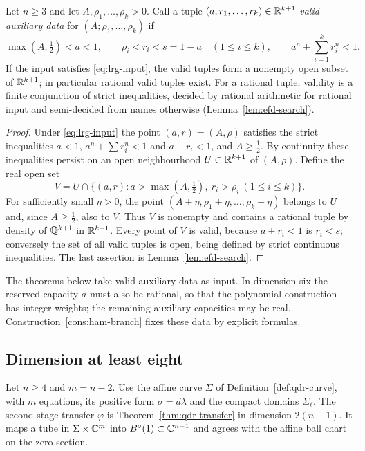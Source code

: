 \begin{lemma}\label{lem:lrg-auxiliary}
Let $n\ge3$ and let $A,\rho_1,\dots,\rho_k>0$. Call a tuple $(a;r_1,\dots,r_k)\in\mathbb{R}^{k+1}$
\emph{valid auxiliary data} for $(A;\rho_1,\dots,\rho_k)$ if
\begin{equation}\label{eq:lrg-certificate}
 \max(A,\tfrac12)<a<1,\qquad \rho_i<r_i<s=1-a\quad(1\le i\le k),\qquad a^n+\sum_{i=1}^kr_i^n<1 .
\end{equation}
If the input satisfies \eqref{eq:lrg-input}, the valid tuples form a nonempty open subset of $\mathbb{R}^{k+1}$; in
particular rational valid tuples exist. For a rational tuple, validity is a finite conjunction of strict inequalities,
decided by rational arithmetic for rational input and semi-decided from names otherwise
(Lemma~\ref{lem:efd-search}).
\end{lemma}

\begin{proof}
Under \eqref{eq:lrg-input} the point $(a,r)=(A,\rho)$ satisfies the strict
inequalities $a<1$, $a^n+\sum r_i^n<1$ and $a+r_i<1$, and $A\ge\frac12$. By continuity these inequalities
persist on an open neighbourhood $U\subset\mathbb{R}^{k+1}$ of $(A,\rho)$. Define the real open set
\[
 V=U\cap\{(a,r):a>\max(A,\tfrac12),\ r_i>\rho_i\ (1\le i\le k)\}.
\]
For sufficiently small $\eta>0$, the point $(A+\eta,\rho_1+\eta,\dots,\rho_k+\eta)$ belongs to $U$ and,
since $A\ge\frac12$, also to $V$. Thus $V$ is nonempty and contains a rational tuple by density of
$\mathbb{Q}^{k+1}$ in $\mathbb{R}^{k+1}$. Every point of $V$ is valid, because $a+r_i<1$ is $r_i<s$; conversely the
set of all valid tuples is open, being defined by strict continuous inequalities. The last assertion is
Lemma~\ref{lem:efd-search}.
\end{proof}

The theorems below take valid auxiliary data as input. In dimension six the reserved capacity $a$ must also be
rational, so that the polynomial construction has integer weights; the remaining auxiliary capacities may be real.
Construction~\ref{cons:ham-branch} fixes these data by explicit formulas.

\subsection{Dimension at least eight}\label{sec:lrg-high}

Let $n\ge4$ and $m=n-2$. Use the affine curve $\Sigma$ of Definition~\ref{def:qdr-curve}, with $m$ equations,
its positive form $\sigma=d\lambda$ and the compact domains $\Sigma_\ell$.
The second-stage transfer $\varphi$ is Theorem~\ref{thm:qdr-transfer} in dimension $2(n-1)$.
It maps a tube in $\Sigma\times\mathbb{C}^m$ into $B^{\circ}(1)\subset\mathbb{C}^{n-1}$ and agrees with the affine ball chart on the zero section.

